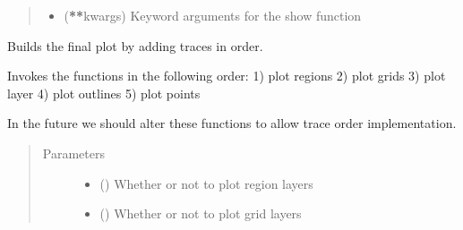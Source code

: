 \documentclass[letterpaper,10pt,english]{sphinxmanual}
\begin{document}
\begin{fulllineitems}
\begin{fulllineitems}
\begin{quote}
\begin{description}
\begin{itemize}
\item {} 
\sphinxAtStartPar
{} ({\color{red}\bfseries{}**}kwargs) \textendash{} Keyword arguments for the show function

\end{itemize}

\end{description}\end{quote}

\end{fulllineitems}


\begin{fulllineitems}
\label{\detokenize{builder:geohexviz.builder.PlotBuilder.finalize}}
\sphinxAtStartPar
Builds the final plot by adding traces in order.

\sphinxAtStartPar
Invokes the functions in the following order:
1) plot regions
2) plot grids
3) plot layer
4) plot outlines
5) plot points

\sphinxAtStartPar
In the future we should alter these functions to
allow trace order implementation.
\begin{quote}\begin{description}
\item[{Parameters}] \leavevmode\begin{itemize}
\item {} 
\sphinxAtStartPar
{} () \textendash{} Whether or not to plot region layers

\item {} 
\sphinxAtStartPar
{} () \textendash{} Whether or not to plot grid layers


\end{itemize}
\end{description}
\end{quote}
\end{fulllineitems}
\end{fulllineitems}
\end{document}
